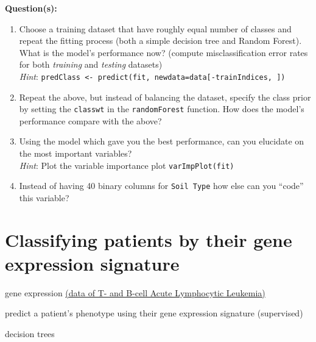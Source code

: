 \documentclass[a4paper,11pt]{article}
\begin{document}
\begin{framed}
\textbf{Question(s):}
\begin{enumerate}
	\item Choose a training dataset that have roughly equal number of classes and repeat the fitting process (both a simple decision tree 
	and Random Forest). What is the model's performance now? (compute misclassification error rates for both \textit{training} and \textit{testing} datasets)
	\\
	\textit{Hint}: \texttt{predClass <- predict(fit, newdata=data[-trainIndices, ])}
	\item Repeat the above, but instead of balancing the dataset, specify the class prior by setting the \texttt{classwt} in the \texttt{randomForest} function.
	How does the model's performance compare with the above?
	\item Using the model which gave you the best performance, can you elucidate on the most important variables? 
	\\
	\textit{Hint}: Plot the variable importance plot \texttt{varImpPlot(fit)} 
	\item Instead of having 40 binary columns for \texttt{Soil Type} how else can you ``code'' this variable?
\end{enumerate}
\end{framed}

\clearpage
\section{Classifying patients by their gene expression signature}
\begin{framed}
\begin{description}[leftmargin=5em,style=nextline]\addtolength{\itemsep}{-0.2\baselineskip}
	\item[Data:] gene expression \href{http://www.bioconductor.org/packages/release/data/experiment/html/ALL.html}{(data of T- and B-cell Acute Lymphocytic Leukemia)}	
	\item[Task:] predict a patient's phenotype using their gene expression signature (supervised)
	\item[Method:] decision trees
\end{description} 
\end{framed}
\end{document}
